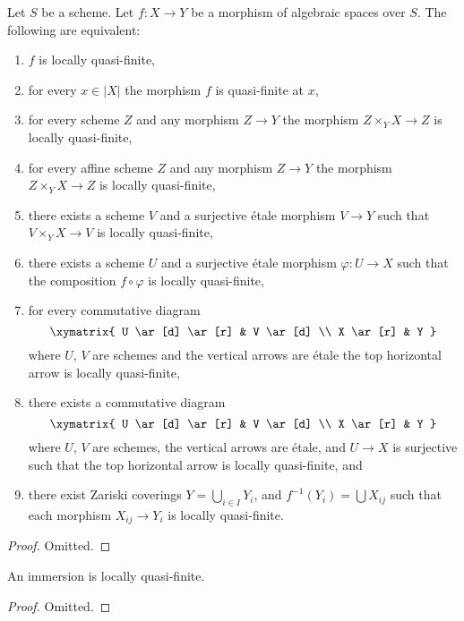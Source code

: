 \begin{lemma}
\label{lemma-quasi-finite-local}
Let $S$ be a scheme.
Let $f : X \to Y$ be a morphism of algebraic spaces over $S$.
The following are equivalent:
\begin{enumerate}
\item $f$ is locally quasi-finite,
\item for every $x \in |X|$ the morphism $f$ is quasi-finite at $x$,
\item for every scheme $Z$ and any morphism $Z \to Y$ the morphism
$Z \times_Y X \to Z$ is locally quasi-finite,
\item for every affine scheme $Z$ and any morphism
$Z \to Y$ the morphism $Z \times_Y X \to Z$ is locally quasi-finite,
\item there exists a scheme $V$ and a surjective \'etale morphism
$V \to Y$ such that $V \times_Y X \to V$ is locally quasi-finite,
\item there exists a scheme $U$ and a surjective \'etale morphism
$\varphi : U \to X$ such that the composition $f \circ \varphi$
is locally quasi-finite,
\item for every commutative diagram
$$
\xymatrix{
U \ar[d] \ar[r] & V \ar[d] \\
X \ar[r] & Y
}
$$
where $U$, $V$ are schemes and the vertical arrows are \'etale
the top horizontal arrow is locally quasi-finite,
\item there exists a commutative diagram
$$
\xymatrix{
U \ar[d] \ar[r] & V \ar[d] \\
X \ar[r] & Y
}
$$
where $U$, $V$ are schemes, the vertical arrows are \'etale, and
$U \to X$ is surjective such that the top horizontal arrow is
locally quasi-finite, and
\item there exist Zariski coverings $Y = \bigcup_{i \in I} Y_i$,
and $f^{-1}(Y_i) = \bigcup X_{ij}$ such that
each morphism $X_{ij} \to Y_i$ is locally quasi-finite.
\end{enumerate}
\end{lemma}

\begin{proof}
Omitted.
\end{proof}

\begin{lemma}
\label{lemma-immersion-quasi-finite}
An immersion is locally quasi-finite.
\end{lemma}

\begin{proof}
Omitted.
\end{proof}

